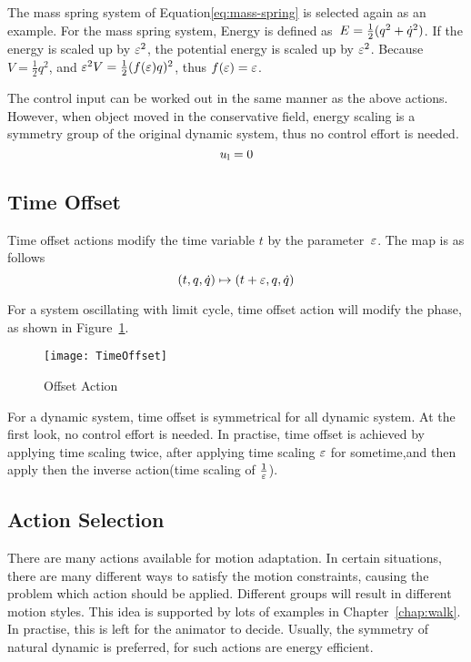The mass spring system of Equation\ref{eq:mass-spring} is selected again as an example.
 For the mass spring system, Energy is defined as~$E=\frac{1}{2}(q^2+\dot{q}^2)$.
 If the energy is scaled up by $\varepsilon^2$,  the potential energy is scaled up by $\varepsilon^2$.
 Because $V= \frac{1}{2}q^2$, and $\varepsilon^2 V=\frac{1}{2}(f(\varepsilon)q)^2$, thus $f(\varepsilon)=\varepsilon$.
 
 
The control input can be worked out in the same manner as the above actions.
However, when object moved in the conservative field, energy scaling is a symmetry group of the original dynamic system, thus no control effort is needed.
\[
u_{\mathrm{l}}=0
\]



\subsection*{Time Offset}

Time offset actions modify the time  variable $t$ by the parameter~$\varepsilon$.
The map is as follows
\[
(t,q,\dot{q}) \mapsto (t+\varepsilon,q,\dot{q})
\]


For a system oscillating with limit cycle, time offset action will modify the phase, as shown in Figure~\ref{fig:gtoff}.
\begin{figure}
  \begin{center}
      \texttt{[image: TimeOffset]}
    \caption{Offset Action}
    \label{fig:gtoff}
\end{center}
\end{figure}

For a dynamic system, time offset is symmetrical for all dynamic system.
At the first look, no control effort is needed.
In practise, time offset is achieved by applying time scaling twice, after applying time scaling $\varepsilon$ for sometime,and then apply then the inverse action(time scaling of $\frac{1}{\varepsilon}$).


\subsection{Action Selection}
There are many actions available for motion adaptation.
In certain situations, there are many different ways to satisfy the motion constraints, causing the problem which action should be applied.
Different groups will result in different motion styles.
This idea is supported by lots of examples in Chapter~\ref{chap:walk}.
In practise, this is left for the animator to decide.
Usually, the symmetry of natural dynamic is preferred, for such actions are energy efficient.








